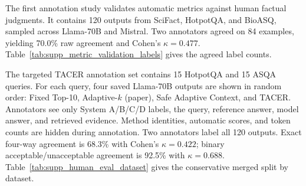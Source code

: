 \documentclass[11pt]{article}
\begin{document}
The first annotation study validates automatic metrics against human factual judgments. It contains 120 outputs from SciFact, HotpotQA, and BioASQ, sampled across Llama-70B and Mistral. Two annotators agreed on 84 examples, yielding 70.0\% raw agreement and Cohen's $\kappa=0.477$. Table~\ref{tab:supp_metric_validation_labels} gives the agreed label counts.

The targeted TACER annotation set contains 15 HotpotQA and 15 ASQA queries. For each query, four saved Llama-70B outputs are shown in random order: Fixed Top-10, Adaptive-$k$ (paper), Safe Adaptive Context, and TACER. Annotators see only System A/B/C/D labels, the query, reference answer, model answer, and retrieved evidence. Method identities, automatic scores, and token counts are hidden during annotation. Two annotators label all 120 outputs. Exact four-way agreement is 68.3\% with Cohen's $\kappa=0.422$; binary acceptable/unacceptable agreement is 92.5\% with $\kappa=0.688$. Table~\ref{tab:supp_human_eval_dataset} gives the conservative merged split by dataset.

\begin{table}[!htbp]
\centering
\small
\caption{Targeted annotation split by dataset using the conservative two-annotator merge. Acceptable = correct or partially correct.}
\label{tab:supp_human_eval_dataset}
\end{table}

\begin{table}[!htbp]
\centering
\small
\caption{Human labels for agreed annotation examples in the metric-validation study.}
\label{tab:supp_metric_validation_labels}
\end{table}
\end{document}
